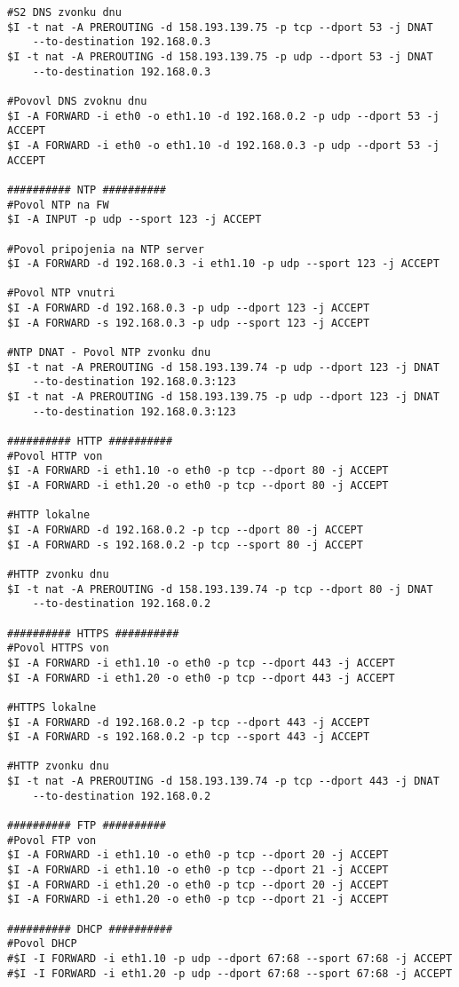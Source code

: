 {\begin{small}
\begin{verbatim}
#S2 DNS zvonku dnu
$I -t nat -A PREROUTING -d 158.193.139.75 -p tcp --dport 53 -j DNAT 
	--to-destination 192.168.0.3
$I -t nat -A PREROUTING -d 158.193.139.75 -p udp --dport 53 -j DNAT 
	--to-destination 192.168.0.3

#Povovl DNS zvoknu dnu
$I -A FORWARD -i eth0 -o eth1.10 -d 192.168.0.2 -p udp --dport 53 -j ACCEPT
$I -A FORWARD -i eth0 -o eth1.10 -d 192.168.0.3 -p udp --dport 53 -j ACCEPT

########## NTP ##########
#Povol NTP na FW
$I -A INPUT -p udp --sport 123 -j ACCEPT

#Povol pripojenia na NTP server
$I -A FORWARD -d 192.168.0.3 -i eth1.10 -p udp --sport 123 -j ACCEPT

#Povol NTP vnutri
$I -A FORWARD -d 192.168.0.3 -p udp --dport 123 -j ACCEPT
$I -A FORWARD -s 192.168.0.3 -p udp --sport 123 -j ACCEPT

#NTP DNAT - Povol NTP zvonku dnu
$I -t nat -A PREROUTING -d 158.193.139.74 -p udp --dport 123 -j DNAT 
	--to-destination 192.168.0.3:123
$I -t nat -A PREROUTING -d 158.193.139.75 -p udp --dport 123 -j DNAT 
	--to-destination 192.168.0.3:123

########## HTTP ##########
#Povol HTTP von
$I -A FORWARD -i eth1.10 -o eth0 -p tcp --dport 80 -j ACCEPT
$I -A FORWARD -i eth1.20 -o eth0 -p tcp --dport 80 -j ACCEPT

#HTTP lokalne
$I -A FORWARD -d 192.168.0.2 -p tcp --dport 80 -j ACCEPT
$I -A FORWARD -s 192.168.0.2 -p tcp --sport 80 -j ACCEPT

#HTTP zvonku dnu
$I -t nat -A PREROUTING -d 158.193.139.74 -p tcp --dport 80 -j DNAT 
	--to-destination 192.168.0.2

########## HTTPS ##########
#Povol HTTPS von
$I -A FORWARD -i eth1.10 -o eth0 -p tcp --dport 443 -j ACCEPT
$I -A FORWARD -i eth1.20 -o eth0 -p tcp --dport 443 -j ACCEPT

#HTTPS lokalne
$I -A FORWARD -d 192.168.0.2 -p tcp --dport 443 -j ACCEPT
$I -A FORWARD -s 192.168.0.2 -p tcp --sport 443 -j ACCEPT

#HTTP zvonku dnu
$I -t nat -A PREROUTING -d 158.193.139.74 -p tcp --dport 443 -j DNAT 
	--to-destination 192.168.0.2

########## FTP ##########
#Povol FTP von
$I -A FORWARD -i eth1.10 -o eth0 -p tcp --dport 20 -j ACCEPT
$I -A FORWARD -i eth1.10 -o eth0 -p tcp --dport 21 -j ACCEPT
$I -A FORWARD -i eth1.20 -o eth0 -p tcp --dport 20 -j ACCEPT
$I -A FORWARD -i eth1.20 -o eth0 -p tcp --dport 21 -j ACCEPT

########## DHCP ##########
#Povol DHCP
#$I -I FORWARD -i eth1.10 -p udp --dport 67:68 --sport 67:68 -j ACCEPT
#$I -I FORWARD -i eth1.20 -p udp --dport 67:68 --sport 67:68 -j ACCEPT


\end{verbatim}
\end{small}}
